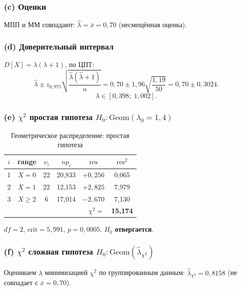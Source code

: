 \documentclass[12pt,a4paper]{article}
\newcommand{\lahat}{\hat{\lambda}}
\newcommand{\xbar}{\bar{x}}
\begin{document}
	\subsubsection*{(c) Оценки}
	МПП и ММ совпадают: $\lahat = \xbar = 0{,}70$ (несмещённая оценка).
	
	\subsubsection*{(d) Доверительный интервал}
	$D[X] = \lambda(\lambda+1)$, по ЦПТ:
	\[
	\lahat \pm z_{0{,}975}\sqrt{\frac{\lahat(\lahat+1)}{n}}
	= 0{,}70 \pm 1{,}96\sqrt{\frac{1{,}19}{50}}
	= 0{,}70 \pm 0{,}3024.
	\]
	\[
	\lambda \in [0{,}398;\; 1{,}002].
	\]
	
	\subsubsection*{(e) $\chi^2$ простая гипотеза $H_0\colon\mathrm{Geom}(\lambda_0=1{,}4)$}
	
	\begin{table}[H]
		\centering
		\begin{tabular}{cccccc}
			\toprule
			$i$ & range & $\nu_i$ & $np_i$ & $\mathrm{res}$ & $\mathrm{res}^2$ \\
			\midrule
			1 & $X=0$   & 22 & 20{,}833 & $+0{,}256$ &  0{,}065 \\
			2 & $X=1$   & 22 & 12{,}153 & $+2{,}825$ &  7{,}979 \\
			3 & $X\ge2$ &  6 & 17{,}014 & $-2{,}670$ &  7{,}130 \\
			\bottomrule
			\multicolumn{5}{r}{$\chi^2 =$} & \textbf{15{,}174} \\
		\end{tabular}
		\caption{Геометрическое распределение: простая гипотеза}
	\end{table}
	
	$df=2$, $\mathrm{crit}=5{,}991$, $p=0{,}0005$. $H_0$ \textbf{отвергается}.
	
	\subsubsection*{(f) $\chi^2$ сложная гипотеза $H_0\colon\mathrm{Geom}(\hat\lambda_{\chi^2})$}
	
	Оцениваем $\lambda$ минимизацией $\chi^2$ по группированным данным:
	$\hat\lambda_{\chi^2} = 0{,}8158$ (не совпадает с $\bar{x}=0{,}70$).
	
\end{document}
